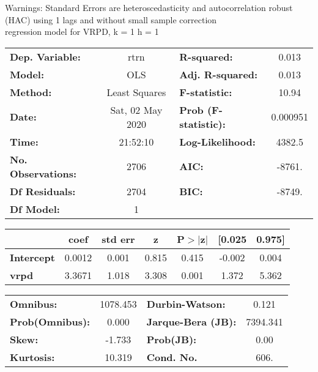 Warnings: \newline
 [1] Standard Errors are heteroscedasticity and autocorrelation robust (HAC) using 1 lags and without small sample correction\\ 

regression model for VRPD, k = 1 h = 1\begin{center}
\begin{tabular}{lclc}
\toprule
\textbf{Dep. Variable:}    &       rtrn       & \textbf{  R-squared:         } &     0.013   \\
\textbf{Model:}            &       OLS        & \textbf{  Adj. R-squared:    } &     0.013   \\
\textbf{Method:}           &  Least Squares   & \textbf{  F-statistic:       } &     10.94   \\
\textbf{Date:}             & Sat, 02 May 2020 & \textbf{  Prob (F-statistic):} &  0.000951   \\
\textbf{Time:}             &     21:52:10     & \textbf{  Log-Likelihood:    } &    4382.5   \\
\textbf{No. Observations:} &        2706      & \textbf{  AIC:               } &    -8761.   \\
\textbf{Df Residuals:}     &        2704      & \textbf{  BIC:               } &    -8749.   \\
\textbf{Df Model:}         &           1      & \textbf{                     } &             \\
\bottomrule
\end{tabular}
\begin{tabular}{lcccccc}
                   & \textbf{coef} & \textbf{std err} & \textbf{z} & \textbf{P$> |$z$|$} & \textbf{[0.025} & \textbf{0.975]}  \\
\midrule
\textbf{Intercept} &       0.0012  &        0.001     &     0.815  &         0.415        &       -0.002    &        0.004     \\
\textbf{vrpd}      &       3.3671  &        1.018     &     3.308  &         0.001        &        1.372    &        5.362     \\
\bottomrule
\end{tabular}
\begin{tabular}{lclc}
\textbf{Omnibus:}       & 1078.453 & \textbf{  Durbin-Watson:     } &    0.121  \\
\textbf{Prob(Omnibus):} &   0.000  & \textbf{  Jarque-Bera (JB):  } & 7394.341  \\
\textbf{Skew:}          &  -1.733  & \textbf{  Prob(JB):          } &     0.00  \\
\textbf{Kurtosis:}      &  10.319  & \textbf{  Cond. No.          } &     606.  \\
\bottomrule
\end{tabular}
\end{center}

